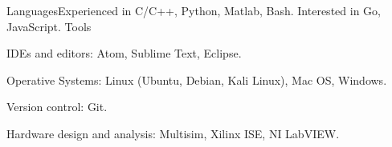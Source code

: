 \begin{cvskills}
	\cvskill
    	{Languages}{Experienced in C/C++, Python, Matlab, Bash. Interested in Go, JavaScript.}
	\cvskill
    	{Tools}{\item IDEs and editors: Atom, Sublime Text, Eclipse.
        		\item Operative Systems: Linux (Ubuntu, Debian, Kali Linux), Mac OS, Windows.
                \item Version control: Git.
                \item Hardware design and analysis: Multisim, Xilinx ISE, NI LabVIEW.
				}
\end{cvskills}
